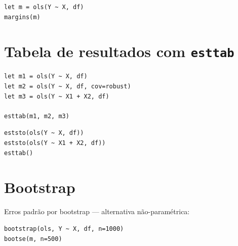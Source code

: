 \begin{lstlisting}
let m = ols(Y ~ X, df)
margins(m)
\end{lstlisting}

\section{Tabela de resultados com \texttt{esttab}}

\begin{lstlisting}[caption={Comparação de especificações}]
let m1 = ols(Y ~ X, df)
let m2 = ols(Y ~ X, df, cov=robust)
let m3 = ols(Y ~ X1 + X2, df)

esttab(m1, m2, m3)
\end{lstlisting}

\begin{lstlisting}
eststo(ols(Y ~ X, df))
eststo(ols(Y ~ X1 + X2, df))
esttab()
\end{lstlisting}

\section{Bootstrap}

Erros padrão por bootstrap — alternativa não-paramétrica:

\begin{lstlisting}
bootstrap(ols, Y ~ X, df, n=1000)
bootse(m, n=500)
\end{lstlisting}
